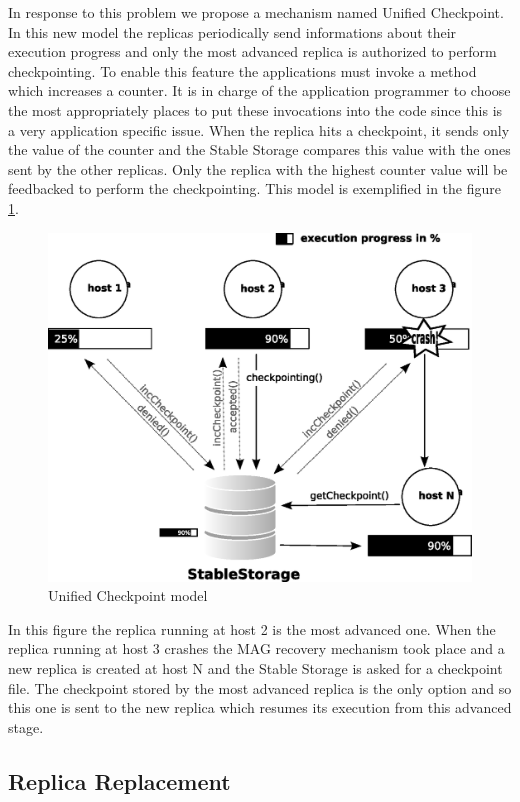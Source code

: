 \documentclass[times, 09pt, twocolumn]{article}
\begin{document}
In response to this problem we propose a mechanism named Unified Checkpoint. In
this new model the replicas periodically send informations about their
execution progress and only the most advanced replica is authorized to perform
checkpointing. To enable this feature the applications must invoke a method
which increases a counter. It is in charge of the application programmer to
choose the most appropriately places to put these invocations into the code
since this is a very application specific issue. When the replica hits a
checkpoint, it sends only the value of the counter and the Stable Storage
compares this value with the ones sent by the other replicas. Only the
replica with the highest counter value will be feedbacked to perform the
checkpointing. This model is exemplified in the figure \ref{fig:repCheckNovo}.

\begin{figure}[th]
\centering \includegraphics[width=0.9\columnwidth]{repCheckNovoFalha.eps}
\caption{Unified Checkpoint model}
\label{fig:repCheckNovo}
\end{figure}

In this figure the replica running at host 2 is the most advanced one. When
the replica running at host 3 crashes the MAG recovery mechanism took place
and a new replica is created at host N and the Stable Storage is asked for a
checkpoint file. The checkpoint stored by the most advanced replica is the only
option and so this one is sent to the new replica which resumes its execution
from this advanced stage. 

\subsection{Replica Replacement}
\end{document}
